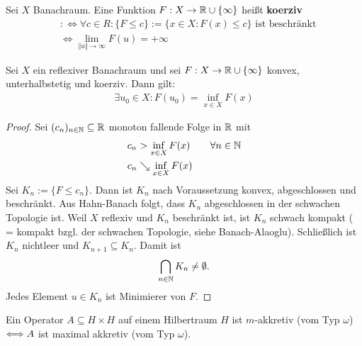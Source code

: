 \begin{erinnerung}
	Sei $X$ Banachraum. 
	Eine Funktion $F:X\to\mathbb{R}\cup\lbrace\infty\rbrace$ heißt \textbf{koerziv}
	\begin{align*}
		&:\Longleftrightarrow\forall c\in R:\big\lbrace F\leq c\big\rbrace:=\big\lbrace x\in X:F(x)\leq c\big\rbrace\text{ ist beschränkt}\\
		&\Longleftrightarrow\lim\limits_{\Vert u\Vert\to\infty} F(u)=+\infty
	\end{align*}
\end{erinnerung}

\begin{theorem}\label{theoremMinimieurngKonvexerFunktionen}\enter
	Sei $X$ ein reflexiver Banachraum und sei $F:X\to\mathbb{R}\cup\lbrace\infty\rbrace$ konvex, unterhalbstetig und koerziv. 
	Dann gilt:
	\begin{align*}
		\exists u_0\in X:F(u_0)=\inf\limits_{x\in X}F(x)
	\end{align*}
\end{theorem}

\begin{proof}
	Sei $(c_n)_{n\in\mathbb{N}}\subseteq\mathbb{R}$ monoton fallende Folge in $\mathbb{R}$ mit
	\begin{align*}
		c_n &> \inf\limits_{x\in X} F(x) \qquad \forall n\in\mathbb{N}\\
		c_n &\searrow \inf\limits_{x\in X}F(x)
	\end{align*}
	Sei $K_n:=\big\lbrace F\leq c_n\big\rbrace$. 
	Dann ist $K_n$ nach Voraussetzung konvex, abgeschlossen und beschränkt. 
	Aus Hahn-Banach folgt, dass $K_n$ abgeschlossen in der schwachen Topologie ist. 
	Weil $X$ reflexiv und $K_n$ beschränkt ist, ist $K_n$ schwach kompakt 
	( = kompakt bzgl. der schwachen Topologie, siehe Banach-Alaoglu). 
	Schließlich ist $K_n$ nichtleer und $K_{n+1}\subseteq K_n$. 
	Damit ist 
	\begin{align*}
		\bigcap\limits_{n\in\mathbb{N}}K_n\neq\emptyset.
	\end{align*}
	Jedes Element $u\in K_n$ ist Minimierer von $F$.
\end{proof}

\begin{theorem}[Minty]\label{theoremMinty}\enter
	Ein Operator $A\subseteq H\times H$ auf einem Hilbertraum $H$ ist $m$-akkretiv (vom Typ $\omega$) 
	$\Longleftrightarrow\\ A$ ist maximal akkretiv (vom Typ $\omega$).
\end{theorem}

